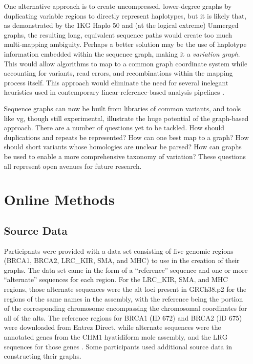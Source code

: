 One alternative approach is to create uncompressed, lower-degree graphs
by duplicating variable regions to directly represent haplotypes, but it
is likely that, as demonstrated by the 1KG Haplo 50 and (at the logical
extreme) Unmerged graphs, the resulting long, equivalent sequence paths
would create too much multi-mapping ambiguity. Perhaps a better solution
may be the use of haplotype information embedded within the sequence
graph\cite{novak2016graph}, making it a \emph{variation graph}. This would
allow algorithms to map to a common graph coordinate system while
accounting for variants, read errors, and recombinations within the
mapping process itself. This approach would eliminate the need for
several inelegant heuristics used in contemporary linear-reference-based
analysis pipelines
\cite{1000_Genomes_Project_Consortium2012-gr,McKenna2010-bg}.

Sequence graphs can now be built from libraries of common variants, and
tools like vg, though still experimental, illustrate the huge potential
of the graph-based approach. There are a number of questions yet to be
tackled. How should duplications and repeats be represented? How can one
best map to a graph? How should short variants whose homologies are
unclear be parsed? How can graphs be used to enable a more comprehensive
taxonomy of variation? These questions all represent open avenues for
future research.

\section{Online Methods}

\subsection{Source Data}

Participants were provided with a data set consisting of five genomic
regions (BRCA1, BRCA2, LRC\_KIR, SMA, and MHC) to use in the creation of
their graphs. The data set came in the form of a ``reference'' sequence
and one or more ``alternate'' sequences for each region. For the
LRC\_KIR, SMA, and MHC regions, those alternate sequences were the alt
loci present in GRCh38.p2 for the regions of the same names in the
assembly, with the reference being the portion of the corresponding
chromosome encompassing the chromosomal coordinates for all of the alts.
The reference regions for BRCA1 (ID 672) and BRCA2 (ID 675) were
downloaded from Entrez Direct, while alternate sequences were the
annotated genes from the CHM1 hyatidiform mole assembly, and the LRG
sequences for those genes
\cite{Kans2016-ca,MacArthur2014-dh,Chaisson2015-wd}. Some participants
used additional source data in constructing their graphs.

